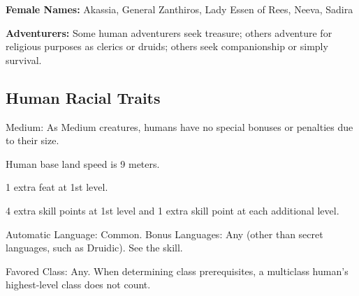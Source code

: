 \textbf{Female Names:} Akassia, General Zanthiros, Lady Essen of Rees, Neeva, Sadira

\textbf{Adventurers:} Some human adventurers seek treasure; others adventure for religious purposes as clerics or druids; others seek companionship or simply survival.

\subsection{Human Racial Traits}
\begin{itemize*}
  \item Medium: As Medium creatures, humans have no special bonuses or penalties due to their size. 
  \item Human base land speed is 9 meters.
  \item 1 extra feat at 1st level.
  \item 4 extra skill points at 1st level and 1 extra skill point at each additional level.
  \item Automatic Language: Common. Bonus Languages: Any (other than secret languages, such as Druidic). See the  skill.
  \item Favored Class: Any. When determining class prerequisites, a multiclass human's highest-level class does not count.
\end{itemize*}
